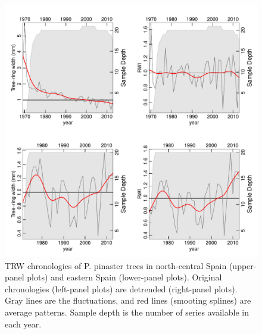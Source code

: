 \documentclass[review,authoryear]{elsarticle}
\begin{document}
\clearpage
\begin{figure}\centering
\includegraphics[scale=0.7,trim=20mm 0mm 20mm 0mm]{RWIs} 
\caption{\gls{TRW} chronologies of \acrshort{P. pinaster} trees in
  north-central Spain (upper-panel plots) and eastern Spain
  (lower-panel plots). Original chronologies (left-panel plots) are
  detrended (right-panel plots). Gray lines are the fluctuations, and
  red lines (smooting splines) are average patterns. Sample depth is
  the number of series available in each year.}
\label{fig:RWIs} 
\end{figure}
\end{document}
